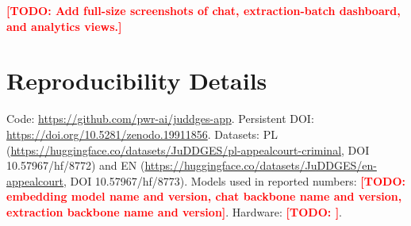 \documentclass[11pt]{article}
\newcommand{\todo}[1]{\textcolor{red}{\textbf{[TODO: #1]}}}
\begin{document}
\todo{Add full-size screenshots of chat, extraction-batch dashboard,
and analytics views.}

\section{Reproducibility Details}
\label{app:repro}

Code: \url{https://github.com/pwr-ai/juddges-app}. Persistent DOI:
\url{https://doi.org/10.5281/zenodo.19911856}. Datasets: PL
(\url{https://huggingface.co/datasets/JuDDGES/pl-appealcourt-criminal},
DOI 10.57967/hf/8772) and EN
(\url{https://huggingface.co/datasets/JuDDGES/en-appealcourt}, DOI
10.57967/hf/8773). Models used in reported numbers: \todo{embedding
model name and version, chat backbone name and version, extraction
backbone name and version}. Hardware: \todo{}.
\end{document}

